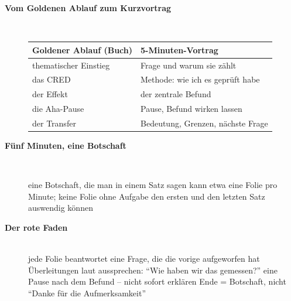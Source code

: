 \begin{description}
\item[{\rot\bf Vom Goldenen Ablauf zum Kurzvortrag}]~\\[-\lblskip]
\begin{center}\nsl{\small}
\begin{tabular}{p{}p{}}
\toprule
\textbf{Goldener Ablauf (Buch)} & \textbf{5-Minuten-Vortrag} \\
\midrule
thematischer Einstieg & Frage und warum sie zählt \\
das CRED & Methode: wie ich es geprüft habe \\
der Effekt & der zentrale Befund \\
die Aha-Pause & Pause, Befund wirken lassen \\
der Transfer & Bedeutung, Grenzen, nächste Frage \\
\bottomrule
\end{tabular}
\end{center}
\os{\newpage}

\item[{\rot\bf Fünf Minuten, eine Botschaft}]~\\[-\lblskip]
\begin{center}
\end{center}
\bi
  \ite eine Botschaft, die man in einem Satz sagen kann
  \ite etwa eine Folie pro Minute; keine Folie ohne Aufgabe
  \ite den ersten und den letzten Satz auswendig können
\ei
\os{\newpage}

\item[{\rot\bf Der rote Faden}]~\\[-\lblskip]
\bi
  \ite jede Folie beantwortet eine Frage, die die vorige aufgeworfen hat
  \ite Überleitungen laut aussprechen: \enquote{Wie haben wir das
    gemessen?}
  \ite eine Pause nach dem Befund -- nicht sofort erklären
  \ite Ende = Botschaft, nicht \enquote{Danke für die Aufmerksamkeit}
\ei
\os{\newpage}
\end{description}

